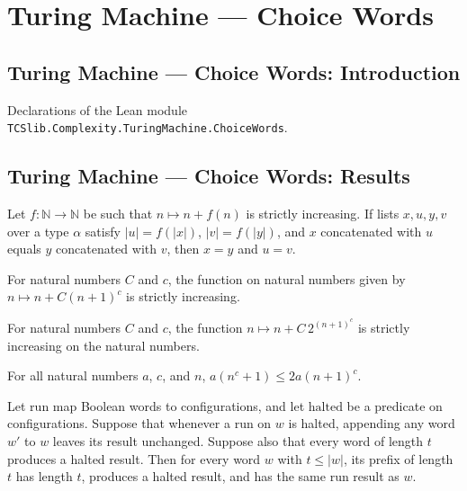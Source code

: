 \section{Turing Machine --- Choice Words}
\subsection*{Turing Machine --- Choice Words: Introduction}

Declarations of the Lean module \texttt{TCSlib.Complexity.TuringMachine.ChoiceWords}.

\subsection*{Turing Machine --- Choice Words: Results}

\begin{theorem}
\label{Turing.append_split_unique}
\leanok
{}
Let $f:\mathbb{N}\to\mathbb{N}$ be such that $n\mapsto n+f(n)$ is strictly increasing.
If lists $x,u,y,v$ over a type $\alpha$ satisfy $|u|=f(|x|)$, $|v|=f(|y|)$, and $x$
concatenated with $u$ equals $y$ concatenated with $v$, then $x=y$ and $u=v$.
\end{theorem}

\begin{theorem}
\label{Turing.certificateLength_strictMono}
\leanok
{}
For natural numbers $C$ and $c$, the function on natural numbers given by $n\mapsto
n+C(n+1)^c$ is strictly increasing.
\end{theorem}

\begin{theorem}
\label{Turing.expCertificateLength_strictMono}
\leanok
{}
For natural numbers $C$ and $c$, the function $n\mapsto n+C\,2^{(n+1)^c}$ is strictly
increasing on the natural numbers.
\end{theorem}

\begin{theorem}
\label{Turing.choiceBudget_le}
\leanok
{}
For all natural numbers $a$, $c$, and $n$, $a(n^c+1)\le 2a(n+1)^c$.
\end{theorem}

\begin{theorem}
\label{Turing.run_take_of_halted}
\leanok
{}
Let $\mathrm{run}$ map Boolean words to configurations, and let $\mathrm{halted}$ be a
predicate on configurations. Suppose that whenever a run on $w$ is halted, appending any
word $w'$ to $w$ leaves its result unchanged. Suppose also that every word of length $t$
produces a halted result. Then for every word $w$ with $t\le |w|$, its prefix of length
$t$ has length $t$, produces a halted result, and has the same run result as $w$.
\end{theorem}

